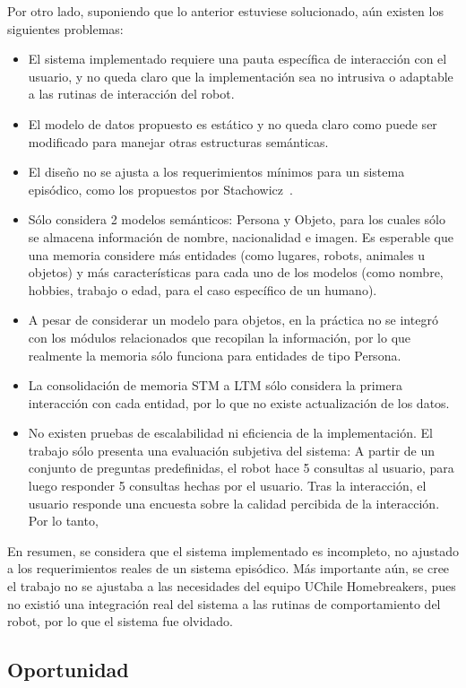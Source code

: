 Por otro lado, suponiendo que lo anterior estuviese solucionado, aún existen los siguientes problemas:
\begin{itemize}
	\item El sistema implementado requiere una pauta específica de interacción con el usuario, y no queda claro que la implementación sea no intrusiva o adaptable a las rutinas de interacción del robot. 
	\item El modelo de datos propuesto es estático y no queda claro como puede ser modificado para manejar otras estructuras semánticas.
	\item El diseño no se ajusta a los requerimientos mínimos para un sistema episódico, como los propuestos por Stachowicz~\cite{Stachowicz2012}.
	\item Sólo considera 2 modelos semánticos: Persona y Objeto, para los cuales sólo se almacena información de nombre, nacionalidad e imagen. Es esperable que una memoria considere más entidades (como lugares, robots, animales u objetos) y más características para cada uno de los modelos (como nombre, hobbies, trabajo o edad, para el caso específico de un humano).
	\item A pesar de considerar un modelo para objetos, en la práctica no se integró con los módulos relacionados que recopilan la información, por lo que realmente la memoria sólo funciona para entidades de tipo Persona.
	\item La consolidación de memoria STM a LTM sólo considera la primera interacción con cada entidad, por lo que no existe actualización de los datos.
	\item No existen pruebas de escalabilidad ni eficiencia de la implementación. El trabajo sólo presenta una evaluación subjetiva del sistema: A partir de un conjunto de preguntas predefinidas, el robot hace 5 consultas al usuario, para luego responder 5 consultas hechas por el usuario. Tras la interacción, el usuario responde una encuesta sobre la calidad percibida de la interacción. Por lo tanto, 
\end{itemize}

En resumen, se considera que el sistema implementado es incompleto, no ajustado a los requerimientos reales de un sistema episódico. Más importante aún, se cree el trabajo no se ajustaba a las necesidades del equipo UChile Homebreakers, pues no existió una integración real del sistema a las rutinas de comportamiento del robot, por lo que el sistema fue olvidado.

\subsection{Oportunidad}

